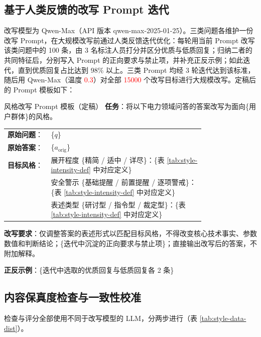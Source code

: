 \documentclass[fontset=fandol,type=master,campus=shenzhen,etitleauto=true]{hithesisbook}
\newcommand{\rev}[1]{\textcolor{red}{#1}}
\begin{document}
\subsection{基于人类反馈的改写 Prompt 迭代}\label{ux57faux4e8e-sft-ux6570ux636eux7684ux573aux666fux9002ux914dux6539ux5199}

改写模型为 Qwen-Max（API 版本 qwen-max-2025-01-25）。三类问题各维护一份改写 Prompt，在大规模改写前通过人类反馈迭代优化：每轮用当前 Prompt 改写该类问题中的 100 条，由 3 名标注人员打分并区分优质与低质回复；归纳二者的共同特征后，分别写入 Prompt 的正向要求与禁止项，并补充正反示例；如此迭代，直到优质回复占比达到 98\% 以上。三类 Prompt 均经 3 轮迭代达到该标准，随后用 Qwen-Max（温度 \rev{0.3}）对全部 \rev{15000} 个改写目标进行大规模改写。定稿后的 Prompt 模板如下：

\begin{promptbox}{风格改写 Prompt 模板（定稿）}
\textbf{任务}：将以下电力领域问答的答案改写为面向\{用户群体\}的风格。\par\smallskip
\begin{tabular}{@{}l@{\;}p{0.78\linewidth}@{}}
\textbf{原始问题}： & \{$q$\} \\
\textbf{原始答案}： & \{$a_{\text{orig}}$\} \\
\textbf{目标风格}： & 展开程度 \{精简 / 适中 / 详尽\}：\{表 \ref{tab:style-intensity-def} 中对应定义\} \\
 & 安全警示 \{基础提醒 / 前置提醒 / 逐项警戒\}：\{表 \ref{tab:style-intensity-def} 中对应定义\} \\
 & 表述类型 \{研讨型 / 指令型 / 裁定型\}：\{表 \ref{tab:style-intensity-def} 中对应定义\} \\
\end{tabular}\par\smallskip
\textbf{改写要求}：仅调整答案的表述形式以匹配目标风格，不得改变核心技术事实、参数数值和判断结论；\{迭代中沉淀的正向要求与禁止项\}；直接输出改写后的答案，不附加解释。\par\smallskip
\textbf{正反示例}：\{迭代中选取的优质回复与低质回复各 2 条\}
\end{promptbox}

\subsection{内容保真度检查与一致性校准}\label{ux4e09ux8f6eux8d28ux91cfux7b5bux9009}

检查与评分全部使用不同于改写模型的 LLM，分两步进行（表 \ref{tab:style-data-dist}）。
\end{document}
